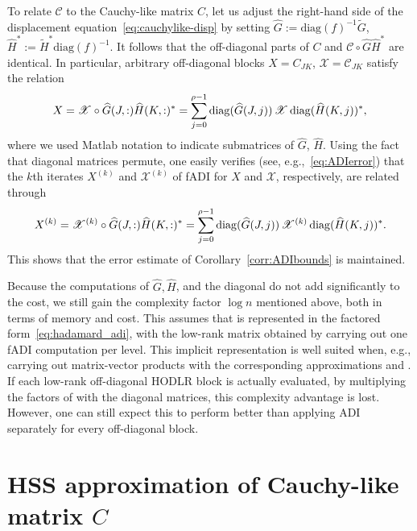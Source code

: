 \documentclass[final,reqno,onefignum,onetabnum]{siamart190516}
\begin{document}
To relate $\mathscr{C}$ to the Cauchy-like matrix $C$, let us adjust the right-hand side of the displacement equation~\eqref{eq:cauchylike-disp} by setting $\widehat G := \mathrm{diag}(f)^{-1} \widetilde G$,
$\widehat H^* := \widetilde{H}^* \mathrm{diag}(f)^{-1}$. It follows that the off-diagonal parts of $C$
and $\mathscr{C} \circ \widehat{G}\widehat{H}^*$ are identical. In particular, arbitrary off-diagonal blocks $X = C_{JK}$, 
$\mathscr{X} = \mathscr{C}_{JK}$ satisfy the relation
\begin{equation} 
\label{eq:hadamard_off}
X = \mathscr{X} \circ \widehat{G}(J,:) \widehat{H}(K,:)^* = \sum_{j = 0}^{\rho-1} {\rm diag}(\widehat G(J,  j))\, \mathscr{X} \,{\rm diag}(\widehat H(K , j))^*,
\end{equation}
where we used Matlab notation to indicate submatrices of $\widehat{G}$, $\widehat{H}$. Using the fact that diagonal matrices permute, one easily verifies (see, e.g.,~\eqref{eq:ADIerror}) that the $k$th iterates $X^{(k)}$ and $\mathscr{X}^{(k)}$ of fADI for $X$ and $\mathscr{X}$, respectively, are related through
\begin{equation} \label{eq:hadamard_adi}
 X^{(k)} = \mathscr{X}^{(k)} \circ \widehat{G}(J,:) \widehat{H}(K,:)^* = \sum_{j = 0}^{\rho-1} {\rm diag}(\widehat G(J,  j))\, \mathscr{X}^{(k)} \,{\rm diag}(\widehat H(K , j))^*.
\end{equation}
This shows that the error estimate of Corollary~\ref{corr:ADIbounds} is maintained.

Because the computations of $\widehat G, \widehat H$, and the diagonal do not add significantly to the cost, we still gain the complexity factor $\log n$ mentioned above, both in terms of memory and cost.
This assumes that  is represented in the factored form~\eqref{eq:hadamard_adi}, with the low-rank matrix obtained by carrying out one fADI computation per level.
This implicit representation is well suited when, e.g., carrying out matrix-vector products with the corresponding approximations  and . 
If each low-rank off-diagonal HODLR block  is actually evaluated, by multiplying the factors of with the diagonal matrices, this complexity advantage is lost. However, one can still expect this to perform
better than applying ADI separately for every off-diagonal block.




\section{HSS approximation of Cauchy-like matrix $C$} 
\label{sec:HSSintro}
\end{document}
